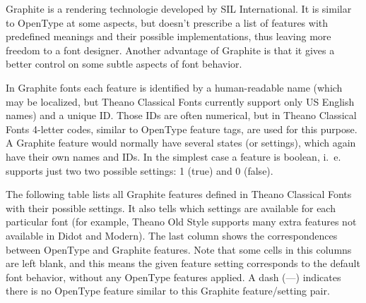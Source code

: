 \documentclass[12pt,a4paper,openany]{article}
\begin{document}
Graphite is a rendering technologie developed by SIL International. It is
similar to OpenType at some aspects, but doesn't prescribe a list of features
with predefined meanings and their possible implementations, thus leaving more
freedom to a font designer. Another advantage of Graphite is that it gives
a better control on some subtle aspects of font behavior.

In Graphite fonts each feature is identified by a human-readable name
(which may be localized, but Theano Classical Fonts currently support only US
English names) and a unique ID. Those IDs are often numerical, but in
Theano Classical Fonts 4-letter codes, similar to OpenType feature tags, are used
for this purpose. A Graphite feature would normally have several states (or
settings), which again have their own names and IDs. In the simplest case
a feature is boolean, i.~e. supports just two two possible settings: 1
(true) and 0 (false).

The following table lists all Graphite features defined in Theano Classical
Fonts with their possible settings. It also tells which settings are available
for each particular font (for example, Theano Old Style supports many extra
features not available in Didot and Modern). The last column shows the
correspondences between OpenType and Graphite features. Note that some cells
in this columns are left blank, and this means the given feature setting
corresponds to the default font behavior, without any OpenType features applied.
A dash (---) indicates there is no OpenType feature similar to this Graphite
feature/setting pair.
\end{document}
